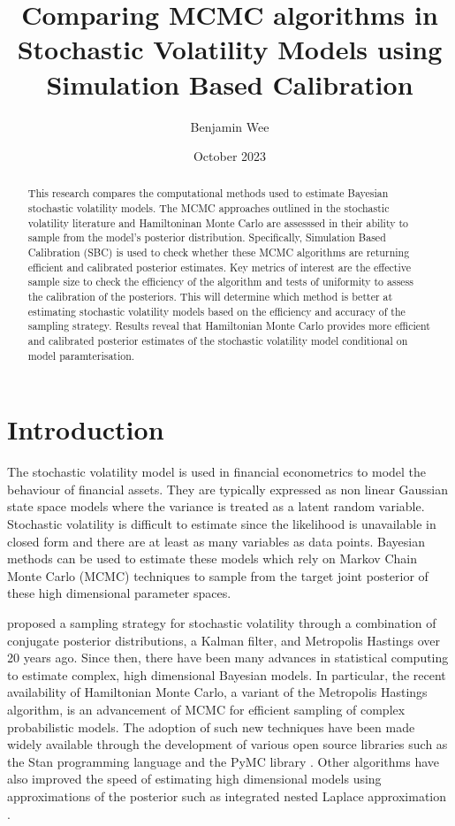 \documentclass[12pt, a4paper]{article}
\title{Comparing MCMC algorithms in Stochastic Volatility Models using Simulation Based Calibration}
\author{Benjamin Wee}
\date{October 2023}
\begin{document}
\maketitle 

\begin{abstract}
    This research compares the computational methods used to estimate Bayesian stochastic volatility models. The MCMC approaches outlined in the stochastic volatility literature and Hamiltoninan Monte Carlo are assesssed in their ability to sample from the model's posterior distribution. Specifically, Simulation Based Calibration (SBC) is used to check whether these MCMC algorithms are returning efficient and calibrated posterior estimates. Key metrics of interest are the effective sample size to check the efficiency of the algorithm and tests of uniformity to assess the calibration of the posteriors. This will determine which method is better at estimating stochastic volatility models based on the efficiency and accuracy of the sampling strategy. Results reveal that Hamiltonian Monte Carlo provides more efficient and calibrated posterior estimates of the stochastic volatility model conditional on model paramterisation. 
\end{abstract}

\newpage

\tableofcontents{\protect\newpage}

\section{Introduction}
    The stochastic volatility model is used in financial econometrics to model the behaviour of financial assets. They are typically expressed as non linear Gaussian state space models where the variance is treated as a latent random variable. Stochastic volatility is difficult to estimate since the likelihood is unavailable in closed form and there are at least as many variables as data points. Bayesian methods can be used to estimate these models which rely on Markov Chain Monte Carlo (MCMC) techniques to sample from the target joint posterior of these high dimensional parameter spaces.

    \citet{kim1998stochastic} proposed a sampling strategy for stochastic volatility through a combination of conjugate posterior distributions, a Kalman filter, and Metropolis Hastings over 20 years ago. Since then, there have been many advances in statistical computing to estimate complex, high dimensional Bayesian models. In particular, the recent availability of Hamiltonian Monte Carlo, a variant of the Metropolis Hastings algorithm, is an advancement of MCMC for efficient sampling of complex probabilistic models. The adoption of such new techniques have been made widely available through the development of various open source libraries such as the Stan programming language \citep{stan} and the PyMC library \citep{pymc2023}. Other algorithms have also improved the speed of estimating high dimensional models using approximations of the posterior such as integrated nested Laplace approximation \citep{rue2009approximate}.
\end{document}
